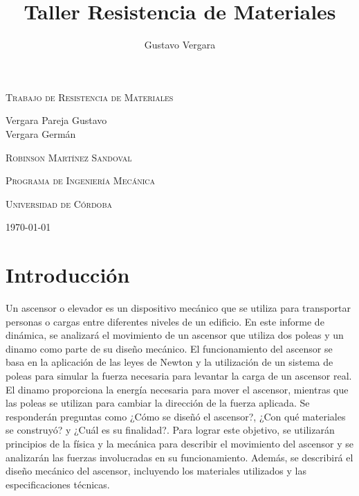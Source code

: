\documentclass{article}
\title{Taller Resistencia de Materiales}
\author{Gustavo Vergara}
\theoremstyle{mytheoremstyle}
\theoremstyle{mytheoremstyle}
\theoremstyle{myproblemstyle}
\begin{document}
    \begin{titlepage}
\centering


\vspace{3cm}
{\scshape\Huge Trabajo de Resistencia de Materiales \par}
\vspace{5cm}
\textbf\large\scshape{\par}
     \vspace{4cm}
     
{\Large Vergara Pareja Gustavo\\Vergara Germán\\\par}
\vspace{5cm}
{\scshape\Large Robinson Martínez Sandoval \par}
\vspace{0.5cm}
{\scshape\Large Programa de Ingeniería Mecánica \par}
\vspace{1cm}
{\scshape\Large Universidad de Córdoba\par}
\vspace{1cm}
{\Large \today \par}
\end{titlepage}
\newpage
\tableofcontents
\newpage

\section*{Introducción}
Un ascensor o elevador es un dispositivo mecánico que se utiliza para transportar personas o 
cargas entre diferentes niveles de un edificio. En este informe de dinámica, se analizará el 
movimiento de un ascensor que utiliza dos poleas y un dinamo como parte de su diseño mecánico.
El funcionamiento del ascensor se basa en la aplicación de las leyes de Newton y la utilización
 de un sistema de poleas para simular la fuerza necesaria para levantar la carga de un ascensor real.
 \newline 
 El dinamo proporciona la energía necesaria para mover el ascensor, mientras que las poleas
  se utilizan para cambiar la dirección de la fuerza aplicada.
Se responderán preguntas 
como ¿Cómo se diseñó el ascensor?, ¿Con qué materiales se construyó? y ¿Cuál es su finalidad?.
\newline
Para lograr este objetivo, se utilizarán principios de la física y la mecánica para describir
 el movimiento del ascensor y se analizarán las fuerzas involucradas en su funcionamiento. 
 Además, se describirá el diseño mecánico del ascensor, incluyendo los materiales utilizados 
 y las especificaciones técnicas.
 \newpage
\end{document}
